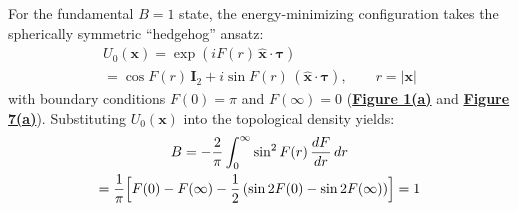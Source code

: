 \documentclass[10pt,aps,prd,twocolumn,superscriptaddress,nofootinbib,floatfix,longbibliography,showkeys]{revtex4-2}
\begin{document}
For the fundamental $B = 1$ state, the energy-minimizing configuration takes the spherically symmetric ``hedgehog'' ansatz:
\begin{multline}
U_0(\mathbf{x}) = \exp\!\left(i F(r)\,\hat{\mathbf{x}}\cdot\boldsymbol{\tau}\right) \\
= \cos F(r)\,\mathbf{I}_2 + i\sin F(r)\,(\hat{\mathbf{x}}\cdot\boldsymbol{\tau}), \qquad r = |\mathbf{x}|
\end{multline}
with boundary conditions $F(0) = \pi$ and $F(\infty) = 0$ (\textbf{\hyperref[fig:fig1]{Figure 1(a)}} and \textbf{\hyperref[fig:fig7]{Figure 7(a)}}). Substituting $U_0(\mathbf{x})$ into the topological density yields:
\begin{multline}
B = -\frac{2}{\pi}\int_0^\infty \sin^2 F(r)\,\frac{dF}{dr}\,dr \\
= \frac{1}{\pi}\Bigl[F(0) - F(\infty) - \frac{1}{2}\left(\sin 2F(0) - \sin 2F(\infty)\right)\Bigr] = 1
\end{multline}
\end{document}
